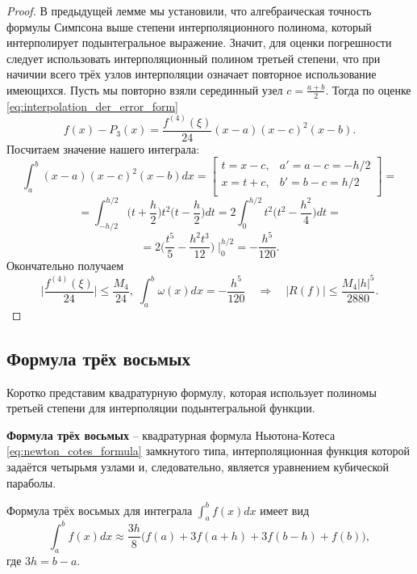 \documentclass[../main.tex]{subfile}
\begin{document}
\begin{proof}
	В предыдущей лемме мы установили, что алгебраическая точность формулы
	Симпсона выше степени интерполяционного полинома, который интерполирует
	подынтегральное выражение. Значит, для оценки погрешности следует
	использовать интерполяционный полином третьей степени, что при начичии
	всего трёх узлов интерполяции означает повторное использование
	имеющихся. Пусть мы повторно взяли серединный узел $c=\frac{a+b}{2}$.
	Тогда по оценке \eqref{eq:interpolation_der_error_form}
	\[f(x)-P_3(x)=\frac{f^{(4)}(\xi)}{24}(x-a)(x-c)^2(x-b).\]
	Посчитаем значение нашего интеграла:
	\[\int_a^b (x-a)(x-c)^2(x-b)dx=
		\begin{bmatrix}
			t=x-c,	& a'=a-c=-h/2 \\
			x=t+c,	& b'=b-c=h/2\\
		\end{bmatrix}
		=
	\]
	\[=\int_{-h/2}^{h/2}\Big(t+\frac{h}{2}\Big)t^2\Big(t-\frac{h}{2}\Big)dt=
	2\int_0^{h/2}t^2\Big(t^2-\frac{h^2}{4}\Big)dt=\]
	\[=2\Big(\frac{t^5}{5}-\frac{h^2t^3}{12}\Big)\;\Big|_0^{h/2}=
	-\frac{h^5}{120}.\]
	Окончательно получаем
	\[\Big|\frac{f^{(4)}(\xi)}{24}\Big|\le\frac{M_4}{24},\;\int_a^b\omega(x)
	dx=-\frac{h^5}{120}\quad\Rightarrow\quad|R(f)|\le\frac{M_4|h|^5}{2880}.\]
\end{proof}

\subsection{Формула трёх восьмых}
Коротко представим квадратурную формулу, которая использует полиномы третьей
степени для интерполяции подынтегральной функции.

\begin{define}
	\textbf{Формула трёх восьмых} -- квадратурная формула Ньютона-Котеса
	\eqref{eq:newton_cotes_formula} замкнутого типа, интерполяционная
	функция которой задаётся четырьмя узлами и, следовательно, является
	уравнением кубической параболы.
\end{define}

\begin{theorem}
	Формула трёх восьмых для интеграла $\int_a^b f(x)dx$ имеет вид
	\[\boxed{\int_a^b f(x)dx\approx\frac{3h}{8}\big(f(a)+3f(a+h)+3f(b-h)+
	f(b)\big)},\]
	где $3h=b-a$.
\end{theorem}
\proofexercise
\end{document}
